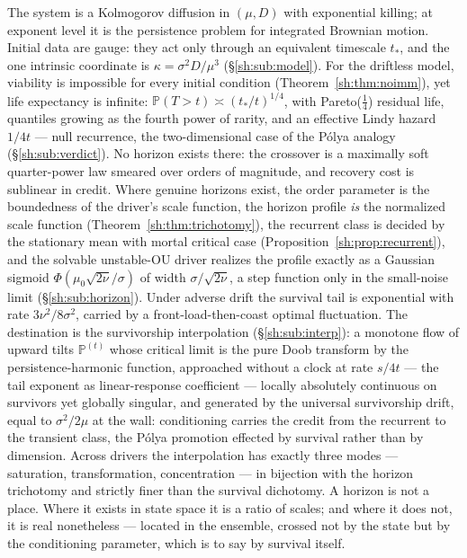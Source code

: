 \documentclass[11pt]{article}
\numberwithin{equation}{section}
\theoremstyle{plain}
\theoremstyle{definition}
\theoremstyle{remark}
\newcommand{\PP}{\mathbb{P}}
\begin{document}
The system is a Kolmogorov diffusion in $(\mu,D)$ with exponential
killing; at exponent level it is the persistence problem for integrated
Brownian motion. Initial data are gauge: they act only through an
equivalent timescale $t_*$, and the one intrinsic coordinate is
$\kappa=\sigma^2D/\mu^3$ (\S\ref{sh:sub:model}). For the driftless model,
viability is impossible for every initial condition
(Theorem~\ref{sh:thm:noimm}), yet life expectancy is infinite:
$\PP(T>t)\asymp(t_*/t)^{1/4}$, with Pareto($\tfrac14$) residual life,
quantiles growing as the fourth power of rarity, and an effective Lindy
hazard $1/4t$ --- null recurrence, the two-dimensional case of the P\'olya
analogy (\S\ref{sh:sub:verdict}). No horizon exists there: the crossover
is a maximally soft quarter-power law smeared over orders of magnitude,
and recovery cost is sublinear in credit. Where genuine horizons exist,
the order parameter is the boundedness of the driver's scale function,
the horizon profile \emph{is} the normalized scale function
(Theorem~\ref{sh:thm:trichotomy}), the recurrent class is decided by the
stationary mean with mortal critical case
(Proposition~\ref{sh:prop:recurrent}), and the solvable unstable-OU
driver realizes the profile exactly as a Gaussian sigmoid
$\Phi(\mu_0\sqrt{2\nu}/\sigma)$ of width $\sigma/\sqrt{2\nu}$, a step
function only in the small-noise limit (\S\ref{sh:sub:horizon}). Under
adverse drift the survival tail is exponential with rate
$3\nu^2/8\sigma^2$, carried by a front-load-then-coast optimal
fluctuation. The destination is the survivorship interpolation
(\S\ref{sh:sub:interp}): a monotone flow of upward tilts $\PP^{(t)}$
whose critical limit is the pure Doob transform by the
persistence-harmonic function, approached without a clock at rate
$s/4t$ --- the tail exponent as linear-response coefficient --- locally
absolutely continuous on survivors yet globally singular, and generated
by the universal survivorship drift, equal to $\sigma^2/2\mu$ at the
wall: conditioning carries the credit from the recurrent to the transient
class, the P\'olya promotion effected by survival rather than by
dimension. Across
drivers the interpolation has exactly three modes --- saturation,
transformation, concentration --- in bijection with the horizon
trichotomy and strictly finer than the survival dichotomy. A horizon is
not a place. Where it exists in state space it is a ratio of scales; and
where it does not, it is real nonetheless --- located in the ensemble,
crossed not by the state but by the conditioning parameter, which is to
say by survival itself.
\end{document}
